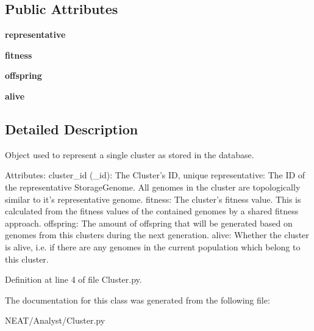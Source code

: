 \subsection*{Public Attributes}
\begin{DoxyCompactItemize}
\item 
{\bfseries representative}\hypertarget{class_n_e_a_t___py_genetics_1_1_n_e_a_t_1_1_analyst_1_1_cluster_1_1_cluster_a6d98b217b836b08679f9b20f9459f2ba}{}\label{class_n_e_a_t___py_genetics_1_1_n_e_a_t_1_1_analyst_1_1_cluster_1_1_cluster_a6d98b217b836b08679f9b20f9459f2ba}

\item 
{\bfseries fitness}\hypertarget{class_n_e_a_t___py_genetics_1_1_n_e_a_t_1_1_analyst_1_1_cluster_1_1_cluster_a1c956f56f9f8e92391eb6c8912d8cd8a}{}\label{class_n_e_a_t___py_genetics_1_1_n_e_a_t_1_1_analyst_1_1_cluster_1_1_cluster_a1c956f56f9f8e92391eb6c8912d8cd8a}

\item 
{\bfseries offspring}\hypertarget{class_n_e_a_t___py_genetics_1_1_n_e_a_t_1_1_analyst_1_1_cluster_1_1_cluster_a29316a5b5546bea6c97896e814ce084e}{}\label{class_n_e_a_t___py_genetics_1_1_n_e_a_t_1_1_analyst_1_1_cluster_1_1_cluster_a29316a5b5546bea6c97896e814ce084e}

\item 
{\bfseries alive}\hypertarget{class_n_e_a_t___py_genetics_1_1_n_e_a_t_1_1_analyst_1_1_cluster_1_1_cluster_a9d814ccf011d42ab14bdade4be3e1fdb}{}\label{class_n_e_a_t___py_genetics_1_1_n_e_a_t_1_1_analyst_1_1_cluster_1_1_cluster_a9d814ccf011d42ab14bdade4be3e1fdb}

\end{DoxyCompactItemize}


\subsection{Detailed Description}
\begin{DoxyVerb}Object used to represent a single cluster as stored
in the database.

Attributes:
    cluster_id (_id):
        The Cluster's ID, unique
    representative:
        The ID of the representative StorageGenome.
        All genomes in the cluster are topologically similar
        to it's representative genome.
    fitness:
        The cluster's fitness value.
        This is calculated from the fitness values of the
        contained genomes by a shared fitness approach.
    offspring:
        The amount of offspring that will be generated based
        on genomes from this clusters during the next generation.
    alive:
        Whether the cluster is alive, i.e. if there are any
        genomes in the current population which belong to this
        cluster.
\end{DoxyVerb}
 

Definition at line 4 of file Cluster.\+py.



The documentation for this class was generated from the following file\+:\begin{DoxyCompactItemize}
\item 
N\+E\+A\+T/\+Analyst/Cluster.\+py\end{DoxyCompactItemize}
